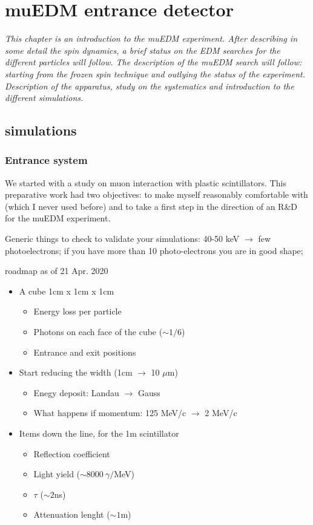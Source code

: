 \chapter{muEDM entrance detector}
\label{ch:muEDM:entrance}
\begin{refsection}

{\itshape
This chapter is an introduction to the muEDM experiment. After describing in some detail the spin dynamics, a brief status on the EDM searches for the different particles will follow.
The description of the muEDM search will follow: starting from the frozen spin technique and outlying the status of the experiment. 
Description of the apparatus, study on the systematics and introduction to the different simulations.}

\section{\gf simulations}
    \label{sec:muEDM:entrance:sim}
    \subsection{Entrance system}
    We started with a study on muon interaction with plastic scintillators. This preparative work had two objectives: to make myself reasonably comfortable with \gf (which I never used before) and to take a first step in the direction of an R\&D for the muEDM experiment.

    Generic things to check to validate your simulations: 40-50 keV $\rightarrow$ few photoelectrons; if you have more than 10 photo-electrons you are in good shape;

roadmap as of 21 Apr. 2020
\begin{itemize}
\item A cube 1cm x 1cm x 1cm
\begin{itemize}
\item Energy loss per particle
\item Photons on each face of the cube ($\sim 1/6$)
\item Entrance and exit positions
\end{itemize}
\item Start reducing the width (1cm $\rightarrow$ 10 $\mu$m)
\begin{itemize}
\item Enegy deposit: Landau $\rightarrow$ Gauss
\item What happens if momentum: 125 MeV/c $\rightarrow$ 2 MeV/c
\end{itemize}
\item Items down the line, for the 1m scintillator
\begin{itemize}
\item Reflection coefficient
\item Light yield ($\sim 8000\ \gamma/$MeV)
\item $\tau$ ($\sim 2$ns)
\item Attenuation lenght ($\sim 1$m)
\end{itemize}
\end{itemize}


\end{refsection}
